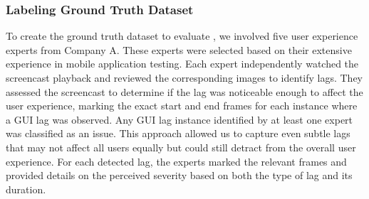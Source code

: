 \subsubsection{Labeling Ground Truth Dataset} %
To create the ground truth dataset to evaluate \tool, we involved five user experience experts from Company A. These experts were selected based on their extensive experience in mobile application testing. 
Each expert independently watched the screencast playback and reviewed the corresponding images to identify lags. They assessed the screencast to determine if the lag was noticeable enough to affect the user experience, marking the exact start and end frames for each instance where a GUI lag was observed. 
Any GUI lag instance identified by at least one expert was classified as an issue. This approach allowed us to capture even subtle lags that may not affect all users equally but could still detract from the overall user experience. For each detected lag, the experts marked the relevant frames and provided details on the perceived severity based on both the type of lag and its duration.




